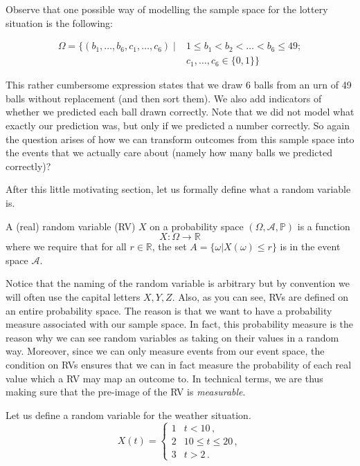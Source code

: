 Observe that one possible way of modelling the sample space for the lottery situation is the following:

\begin{align}
\Omega = \{(b_{1}, \ldots, b_{6}, c_{1}, \ldots, c_{6}) \mid &1 \leq b_{1} < b_2 < \ldots < b_{6} \leq 49;\\
& c_{1}, \ldots, c_{6} \in \{0,1\} \} \nonumber
\end{align}

This rather cumbersome expression states that we draw 6 balls from an urn of 49 balls without replacement (and then sort them). We also add indicators of whether we predicted each ball drawn correctly. Note that we did not model what exactly our prediction was, but only if we predicted a number correctly. So again the question arises of how we can transform outcomes from this sample space into
the events that we actually care about (namely how many balls we predicted correctly)?

\medskip
After this little motivating section, let us formally define what a random variable is.

\begin{Definition}
A (real) random variable (RV) $X$ on a probability space $(\Omega, \mathcal{A}, \mathbb{P})$ is a function
$$ X: \Omega \rightarrow \mathbb{R} $$
where we require that for
all $ r \in \mathbb{R} $, the set $ A = \{\omega| X(\omega) \leq r\} $ is in the event space $ \mathcal{A}$.
\end{Definition}

Notice that the naming of the random variable is arbitrary but by convention we will often use the capital letters
$ X,Y,Z $. Also, as you can see, RVs are defined on an entire probability space. The reason is that
we want to have a probability measure associated with our sample space. 
In fact, this probability measure is the reason why we can see random variables as taking on their values
in a random way. Moreover, since we can only measure events from our event space, the condition on RVs
ensures that we can in fact measure the probability of each real value which a RV may map an outcome to.
In technical terms, we are thus making sure that the pre-image of the RV is \textit{measurable}.

Let us define a random variable for the weather situation. 
\begin{equation} \label{weatherRV}
X(t) = 
\begin{cases}
1 & t < 10 \, , \\
2 & 10 \leq t \leq 20 \, ,\\
3 & t > 2 \, .
\end{cases}
\end{equation}


